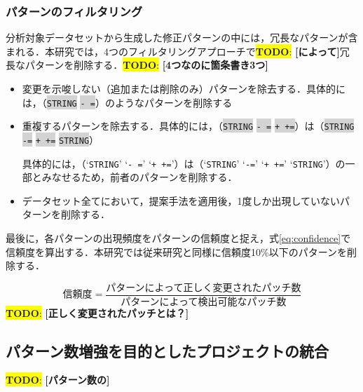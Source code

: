 \documentclass[T,J]{fose} %
\newcommand{\todo}[1]{\colorbox{yellow}{{\bf TODO}:}{\color{red} {\textbf{[#1]}}}}
\begin{document}
\subsubsection{パターンのフィルタリング}\label{subsubsec:filtering}
分析対象データセットから生成した修正パターンの中には，冗長なパターンが含まれる．本研究では，4つのフィルタリングアプローチで\todo{によって}冗長なパターンを削除する．\todo{4つなのに箇条書き3つ}
\begin{itemize}
    \item 変更を示唆しない（追加または削除のみ）パターンを除去する．具体的には，（\colorbox{lightgray}{\texttt{STRING}} \colorbox{lightgray}{\texttt{- =}}）のようなパターンを削除する
    \item 重複するパターンを除去する．具体的には，（\colorbox{lightgray}{\texttt{STRING}} \colorbox{lightgray}{\texttt{- =}} \colorbox{lightgray}{\texttt{+ +=}}）は（\colorbox{lightgray}{\texttt{STRING}} \colorbox{lightgray}{\texttt{-=}} \colorbox{lightgray}{\texttt{+ +=}} \colorbox{lightgray}{\texttt{STRING}}）
    
    具体的には，（`\texttt{STRING}' `\texttt{- =}' `\texttt{+ +=}'）は（`\texttt{STRING}' `\texttt{-=}' `\texttt{+ +=}' `\texttt{STRING}'）の一部とみなせるため，前者のパターンを削除する．
    \item データセット全てにおいて，提案手法を適用後，1度しか出現していないパターンを削除する．
\end{itemize}

最後に，各パターンの出現頻度をパターンの信頼度と捉え，式\ref{eq:confidence}で信頼度を算出する．本研究では従来研究と同様に信頼度10\%以下のパターンを削除する．

\begin{equation}\label{eq:confidence}
\text{信頼度} = \frac{\text{パターンによって正しく変更されたパッチ数}}{\text{パターンによって検出可能なパッチ数}}
\end{equation}\todo{正しく変更されたパッチとは？}

\subsection{パターン数増強を目的としたプロジェクトの統合}\label{subsec:integrate}\todo{パターン数の}
\end{document}
